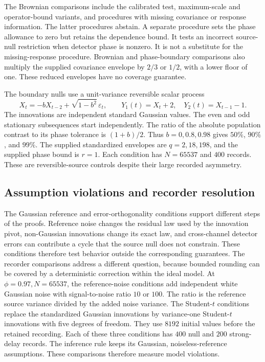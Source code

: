 The Brownian comparisons include the calibrated test, maximum-scale and operator-bound variants, and procedures with missing covariance or response information. The latter procedures abstain. A separate procedure sets the phase allowance to zero but retains the dependence bound. It tests an incorrect source-null restriction when detector phase is nonzero. It is not a substitute for the missing-response procedure. Brownian and phase-boundary comparisons also multiply the supplied covariance envelope by $2/3$ or $1/2$, with a lower floor of one. These reduced envelopes have no coverage guarantee.

The boundary nulls use a unit-variance reversible scalar process
\[
 X_t=-bX_{t-2}+\sqrt{1-b^2}\,\varepsilon_t,
 \qquad Y_1(t)=X_t+2,\quad Y_2(t)=X_{t-1}-1.
\]
The innovations are independent standard Gaussian values. The even and odd stationary subsequences start independently. The ratio of the absolute population contrast to its phase tolerance is $(1+b)/2$. Thus $b=0,0.8,0.98$ gives $50\%$, $90\%$, and $99\%$. The supplied standardized envelopes are $q=2,18,198$, and the supplied phase bound is $r=1$. Each condition has $N=65537$ and $400$ records. These are reversible-source controls despite their large recorded asymmetry.

\subsection{Assumption violations and recorder resolution}
The Gaussian reference and error-orthogonality conditions support different steps of the proofs. Reference noise changes the residual law used by the innovation pivot, non-Gaussian innovations change its exact law, and cross-channel detector errors can contribute a cycle that the source null does not constrain. These conditions therefore test behavior outside the corresponding guarantees. The recorder comparisons address a different question, because bounded rounding can be covered by a deterministic correction within the ideal model.
At $\phi=0.97,N=65537$, the reference-noise conditions add independent white Gaussian noise with signal-to-noise ratio $10$ or $100$. The ratio is the reference source variance divided by the added noise variance. The Student-$t$ conditions replace the standardized Gaussian innovations by variance-one Student-$t$ innovations with five degrees of freedom. They use $8192$ initial values before the retained recording. Each of these three conditions has $400$ null and $200$ strong-delay records. The inference rule keeps its Gaussian, noiseless-reference assumptions. These comparisons therefore measure model violations.

